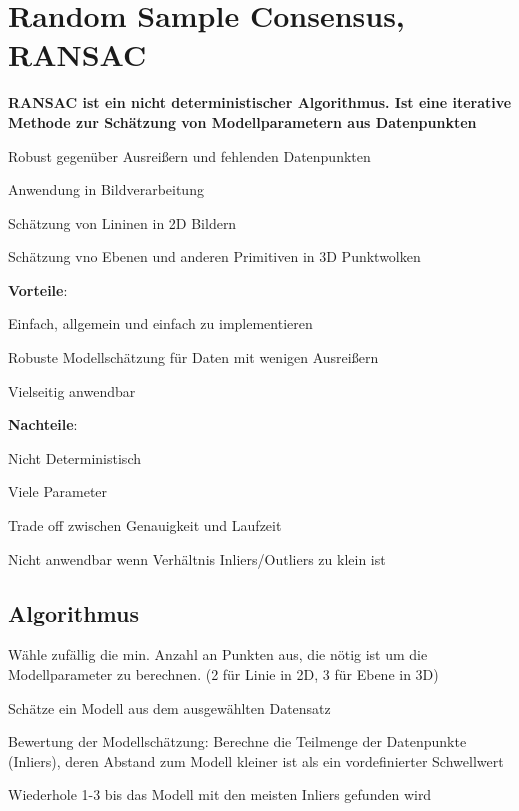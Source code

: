 \section{Random Sample Consensus, RANSAC}
\begin{compactitem}
    \item \textbf{RANSAC ist ein nicht deterministischer Algorithmus. Ist eine iterative
    Methode zur Schätzung von Modellparametern aus Datenpunkten}
    \item Robust gegenüber Ausreißern und fehlenden Datenpunkten
    \item Anwendung in  Bildverarbeitung
    \begin{compactitem}
        \item Schätzung von Lininen in 2D Bildern
        \item Schätzung vno Ebenen und anderen Primitiven in 3D Punktwolken
    \end{compactitem}
    \item \textbf{Vorteile}:
    \begin{compactitem}
        \item Einfach, allgemein und einfach zu implementieren
        \item Robuste Modellschätzung für Daten mit wenigen Ausreißern
        \item Vielseitig anwendbar
    \end{compactitem}
    \item \textbf{Nachteile}:
    \begin{compactitem}
        \item Nicht Deterministisch
        \item Viele Parameter
        \item Trade off zwischen Genauigkeit und Laufzeit
        \item Nicht anwendbar wenn Verhältnis Inliers/Outliers zu klein ist
    \end{compactitem}
\end{compactitem}

\subsection{Algorithmus}
\begin{compactenum}
    \item Wähle zufällig die min. Anzahl an Punkten aus, die nötig ist um die
    Modellparameter zu berechnen. (2 für Linie in 2D, 3 für Ebene in 3D)
    \item Schätze ein Modell aus dem ausgewählten Datensatz
    \item Bewertung der Modellschätzung: Berechne die Teilmenge der Datenpunkte
    (Inliers), deren Abstand zum Modell kleiner ist als ein vordefinierter Schwellwert
    \item Wiederhole 1-3 bis das Modell mit den meisten Inliers gefunden wird
\end{compactenum}

